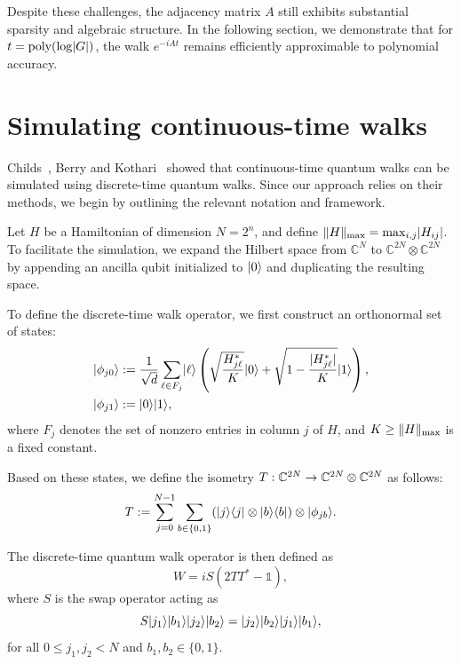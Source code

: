 \documentclass[12pt]{report}
\begin{document}
Despite these challenges, the adjacency matrix \( A \) still exhibits substantial sparsity and algebraic structure. In the following section, we demonstrate that for \( t = \operatorname{poly}(\log \lvert G\rvert) \), the walk \( e^{-iAt} \) remains efficiently approximable to polynomial accuracy.




\section{Simulating continuous-time walks}
Childs~\cite{Childs2004}, Berry and Kothari~\cite{BerryKothari} showed that continuous-time quantum walks can be simulated using discrete-time quantum walks. Since our approach relies on their methods, we begin by outlining the relevant notation and framework.

Let \( H \) be a Hamiltonian of dimension \( N = 2^n \), and define \( \lVert H\rVert_{\mathrm{max}} = \max_{i, j} \lvert H_{ij}\rvert \). To facilitate the simulation, we expand the Hilbert space from \( \mathbb{C}^N \) to \( \mathbb{C}^{2N} \otimes \mathbb{C}^{2N} \) by appending an ancilla qubit initialized to \( \lvert0\rangle \) and duplicating the resulting space.

To define the discrete-time walk operator, we first construct an orthonormal set of states:
\begin{align}
    \lvert\phi_{j0}\rangle & := \frac{1}{\sqrt{d}} \sum_{\ell \in F_j} \lvert\ell\rangle \left( \sqrt{\frac{H_{j\ell}^*}{K}} \lvert0\rangle + \sqrt{1 - \frac{\lvert H_{j\ell}^*\rvert}{K}} \lvert1\rangle \right), \label{eq:walk-sim} \\
    \lvert\phi_{j1}\rangle & := \lvert0\rangle \lvert1\rangle, \nonumber
\end{align}
where \( F_j \) denotes the set of nonzero entries in column \( j \) of \( H \), and \( K \ge \lVert H\rVert_{\mathrm{max}} \) is a fixed constant.

Based on these states, we define the isometry \( T : \mathbb{C}^{2N} \to \mathbb{C}^{2N} \otimes \mathbb{C}^{2N} \) as follows:
\begin{equation}
    \label{eq:walk-isom}
    T := \sum_{j = 0}^{N - 1} \sum_{b \in \{0, 1\}} (\lvert j\rangle\langle j\rvert \otimes \lvert b\rangle\langle b\rvert) \otimes \lvert\phi_{jb}\rangle.
\end{equation}

The discrete-time quantum walk operator is then defined as
\[
W = iS(2TT^* - \mathds{1}),
\]
where \( S \) is the swap operator acting as
\[
S \lvert j_1\rangle \lvert b_1\rangle \lvert j_2\rangle \lvert b_2\rangle = \lvert j_2\rangle \lvert b_2\rangle \lvert j_1\rangle \lvert b_1\rangle,
\]
for all \( 0 \le j_1, j_2 < N \) and \( b_1, b_2 \in \{0, 1\} \).
\end{document}
